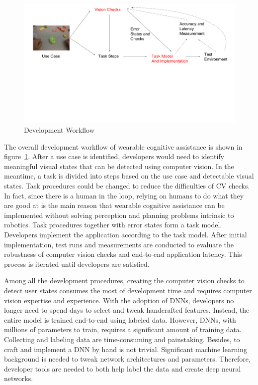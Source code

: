 \begin{figure}
  \centering
  \includegraphics[trim={0 10cm 0 0},width=\linewidth]{FIGS/ad-hoc-workflow}
  \hspace{-0.50in}
	\caption{Development Workflow}
    \vspace{-0.0in}
    \label{fig:workflow}
\end{figure}

The overall development workflow of wearable cognitive assistance is shown in
figure~\ref{fig:workflow}. After a use case is identified, developers would need
to identify meaningful visual states that can be detected using computer vision.
In the meantime, a task is divided into steps based on the use case and
detectable visual states. Task procedures could be changed to reduce the
difficulties of CV checks. In fact, since there is a human in the loop, relying
on humans to do what they are good at is the main reason that wearable cognitive
assistance can be implemented without solving perception and planning problems
intrinsic to robotics. Task procedures together with error states form a task
model. Developers implement the application according to the task model. After
 initial implementation, test runs and measurements are conducted to evaluate
the robustness of computer vision checks and end-to-end application latency.
This process is iterated until developers are satisfied.

Among all the development procedures, creating the computer vision checks to
detect user states consumes the most of development time and requires computer
vision expertise and experience. With the adoption of DNNs, developers no longer
need to spend days to select and tweak handcrafted features. Instead, the entire
model is trained end-to-end using labeled data. However, DNNs, with millions of
parameters to train, requires a significant amount of training data. Collecting
and labeling data are time-consuming and painstaking. Besides, to craft and
implement a DNN by hand is not trivial. Significant machine learning background
is needed to tweak network architectures and parameters. Therefore, developer
tools are needed to both help label the data and create deep neural networks.

